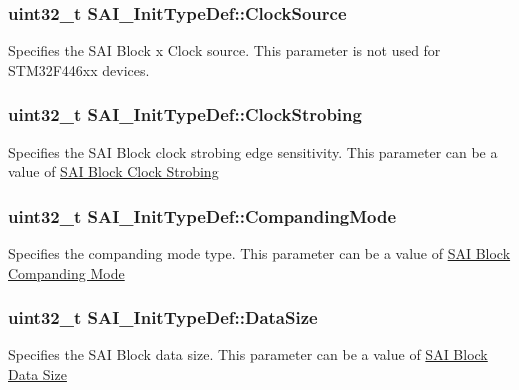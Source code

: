 \subsubsection[{\texorpdfstring{Clock\+Source}{ClockSource}}]{\setlength{\rightskip}{0pt plus 5cm}uint32\+\_\+t S\+A\+I\+\_\+\+Init\+Type\+Def\+::\+Clock\+Source}\hypertarget{struct_s_a_i___init_type_def_a6f85a4b8ed1b1d144525cd502f5fe15e}{}\label{struct_s_a_i___init_type_def_a6f85a4b8ed1b1d144525cd502f5fe15e}
Specifies the S\+AI Block x Clock source. This parameter is not used for S\+T\+M32\+F446xx devices. 
\subsubsection[{\texorpdfstring{Clock\+Strobing}{ClockStrobing}}]{\setlength{\rightskip}{0pt plus 5cm}uint32\+\_\+t S\+A\+I\+\_\+\+Init\+Type\+Def\+::\+Clock\+Strobing}\hypertarget{struct_s_a_i___init_type_def_a2d835ab2f64a7b8724e1f66db1a328a2}{}\label{struct_s_a_i___init_type_def_a2d835ab2f64a7b8724e1f66db1a328a2}
Specifies the S\+AI Block clock strobing edge sensitivity. This parameter can be a value of \hyperlink{group___s_a_i___block___clock___strobing}{S\+AI Block Clock Strobing} 
\subsubsection[{\texorpdfstring{Companding\+Mode}{CompandingMode}}]{\setlength{\rightskip}{0pt plus 5cm}uint32\+\_\+t S\+A\+I\+\_\+\+Init\+Type\+Def\+::\+Companding\+Mode}\hypertarget{struct_s_a_i___init_type_def_ac6534c74273d06309fe2a38d6c791ff1}{}\label{struct_s_a_i___init_type_def_ac6534c74273d06309fe2a38d6c791ff1}
Specifies the companding mode type. This parameter can be a value of \hyperlink{group___s_a_i___block___companding___mode}{S\+AI Block Companding Mode} 
\subsubsection[{\texorpdfstring{Data\+Size}{DataSize}}]{\setlength{\rightskip}{0pt plus 5cm}uint32\+\_\+t S\+A\+I\+\_\+\+Init\+Type\+Def\+::\+Data\+Size}\hypertarget{struct_s_a_i___init_type_def_a74372832a9b609290a1b476533686564}{}\label{struct_s_a_i___init_type_def_a74372832a9b609290a1b476533686564}
Specifies the S\+AI Block data size. This parameter can be a value of \hyperlink{group___s_a_i___block___data___size}{S\+AI Block Data Size} 
